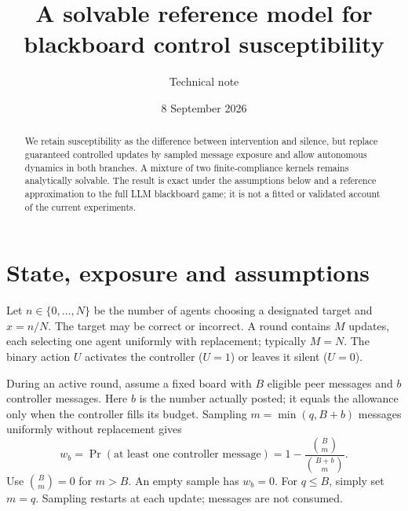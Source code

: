 \documentclass[11pt,a4paper]{article}
\title{A solvable reference model for\\blackboard control susceptibility}
\author{Technical note}
\date{8 September 2026}
\begin{document}
\maketitle
\vspace{-1.5em}
\begin{abstract}
We retain susceptibility as the difference between intervention and silence, but replace guaranteed controlled updates by sampled message exposure and allow autonomous dynamics in both branches. A mixture of two finite-compliance kernels remains analytically solvable. The result is exact under the assumptions below and a reference approximation to the full LLM blackboard game; it is not a fitted or validated account of the current experiments.
\end{abstract}

\section{State, exposure and assumptions}
Let $n\in\{0,\ldots,N\}$ be the number of agents choosing a designated target and $x=n/N$. The target may be correct or incorrect. A round contains $M$ updates, each selecting one agent uniformly with replacement; typically $M=N$. The binary action $U$ activates the controller ($U=1$) or leaves it silent ($U=0$).

During an active round, assume a fixed board with $B$ eligible peer messages and $b$ controller messages. Here $b$ is the number actually posted; it equals the allowance only when the controller fills its budget. Sampling $m=\min(q,B+b)$ messages uniformly without replacement gives
\begin{equation}
 w_b=\Pr(\text{at least one controller message})
 =1-\frac{\binom{B}{m}}{\binom{B+b}{m}}.
 \label{eq:exposure}
\end{equation}
Use $\binom{B}{m}=0$ for $m>B$. An empty sample has $w_b=0$. For $q\leq B$, simply set $m=q$. Sampling restarts at each update; messages are not consumed.
\end{document}
